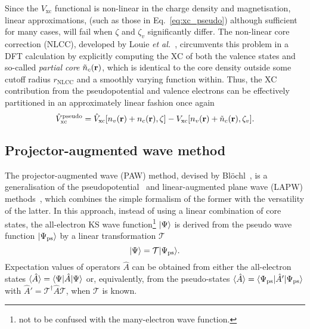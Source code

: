 {Since the $V_\textrm{xc}$ functional is non-linear in 
the charge density and magnetisation,   
linear approximations, (such as those in Eq.~\eqref{eq:xc_pseudo}) 
although sufficient for many cases,  
will fail when $\zeta$ and $\zeta_v$ significantly differ.
%
The non-linear core correction (NLCC), 
developed by Louie {\it et al.}~\cite{PhysRevB.26.1738}, 
circumvents this problem in a DFT calculation 
by explicitly computing the XC of both the 
valence states and so-called {\it partial core} $\tilde{n}_c({\bf r})$, 
which is identical to the core density 
outside some cutoff radius $r_\textrm{NLCC}$ 
and a smoothly varying function within.
%
{
Thus, the XC contribution from the pseudopotential 
and valence electrons can be effectively partitioned 
in an approximately linear fashion once again}
% 
\begin{equation}
\hat{V}_\textrm{xc}^\textrm{pseudo}=\hat{V}_\textrm{xc}[n_v({\bf r})+n_c({\bf r}),\zeta] -V_\textrm{xc}[n_v({\bf r})+\tilde{n}_c({\bf r}),\zeta_v].
\label{eq:xc_pseudo2}
\end{equation}
}


\subsection{Projector-augmented wave method}
The projector-augmented wave (PAW) method, 
devised by Bl{\"o}chl~\cite{PhysRevB.50.17953}, 
is a generalisation of the 
pseudopotential~\cite{HEINE19701,PhysRev.112.685,PhysRev.116.287}
and linear-augmented plane wave (LAPW) 
methods~\cite{0305-4608-5-11-016,PhysRevB.12.3060}, 
which combines the simple formalism of the former 
with the versatility of the latter.
%
In this approach, 
instead of using a linear combination of core states, 
the all-electron KS 
wave function\footnote{not to be confused with the many-electron wave function.} 
$\vert\Psi\rangle$ 
is derived from the pseudo  
wave function 
$\vert\Psi_\textrm{ps}\rangle$ by a linear transformation $\mathcal{T}$ 
%
\begin{equation}
\vert\Psi\rangle=\mathcal{T}\vert\Psi_\textrm{ps}\rangle.
\label{eq:paw_1}
\end{equation}
%
Expectation values of 
operators $\hat{A}$ 
can be obtained from either the all-electron states 
$\langle \hat{A}\rangle=\langle\Psi\vert\hat{A}\vert\Psi\rangle$ 
or, equivalently, from the pseudo-states 
$\langle \hat{A}\rangle=\langle\Psi_\textrm{ps}\vert\hat{A}'\vert\Psi_\textrm{ps}\rangle$ 
with 
$\hat{A}'=\mathcal{T}^\dagger \hat{A} \mathcal{T}$, 
when $\mathcal{T}$ is known.
%

